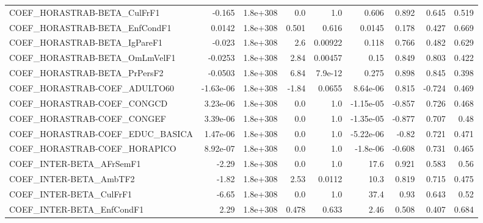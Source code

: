 \begin{tabular}{lrrrrrrrr}
COEF\_HORASTRAB-BETA\_CulFrF1           &      -0.165 &     1.8e+308 &     0.0 &      1.0 &      0.606 &       0.892 &        0.645 &         0.519 \\
COEF\_HORASTRAB-BETA\_EnfCondF1         &      0.0142 &     1.8e+308 &   0.501 &    0.616 &     0.0145 &       0.178 &        0.427 &         0.669 \\
COEF\_HORASTRAB-BETA\_IgPareF1          &      -0.023 &     1.8e+308 &     2.6 &  0.00922 &      0.118 &       0.766 &        0.482 &         0.629 \\
COEF\_HORASTRAB-BETA\_OmLmVelF1         &     -0.0253 &     1.8e+308 &    2.84 &  0.00457 &       0.15 &       0.849 &        0.803 &         0.422 \\
COEF\_HORASTRAB-BETA\_PrPersF2          &     -0.0503 &     1.8e+308 &    6.84 &  7.9e-12 &      0.275 &       0.898 &        0.845 &         0.398 \\
COEF\_HORASTRAB-COEF\_ADULTO60          &   -1.63e-06 &     1.8e+308 &   -1.84 &   0.0655 &   8.64e-06 &       0.815 &       -0.724 &         0.469 \\
COEF\_HORASTRAB-COEF\_CONGCD            &    3.23e-06 &     1.8e+308 &     0.0 &      1.0 &  -1.15e-05 &      -0.857 &        0.726 &         0.468 \\
COEF\_HORASTRAB-COEF\_CONGEF            &    3.39e-06 &     1.8e+308 &     0.0 &      1.0 &  -1.35e-05 &      -0.877 &        0.707 &          0.48 \\
COEF\_HORASTRAB-COEF\_EDUC\_BASICA       &    1.47e-06 &     1.8e+308 &     0.0 &      1.0 &  -5.22e-06 &       -0.82 &        0.721 &         0.471 \\
COEF\_HORASTRAB-COEF\_HORAPICO          &    8.92e-07 &     1.8e+308 &     0.0 &      1.0 &   -1.8e-06 &      -0.608 &        0.731 &         0.465 \\
COEF\_INTER-BETA\_AFrSemF1              &       -2.29 &     1.8e+308 &     0.0 &      1.0 &       17.6 &       0.921 &        0.583 &          0.56 \\
COEF\_INTER-BETA\_AmbTF2                &       -1.82 &     1.8e+308 &    2.53 &   0.0112 &       10.3 &       0.819 &        0.715 &         0.475 \\
COEF\_INTER-BETA\_CulFrF1               &       -6.65 &     1.8e+308 &     0.0 &      1.0 &       37.4 &        0.93 &        0.643 &          0.52 \\
COEF\_INTER-BETA\_EnfCondF1             &        2.29 &     1.8e+308 &   0.478 &    0.633 &       2.46 &       0.508 &        0.407 &         0.684 \\

\end{tabular}
